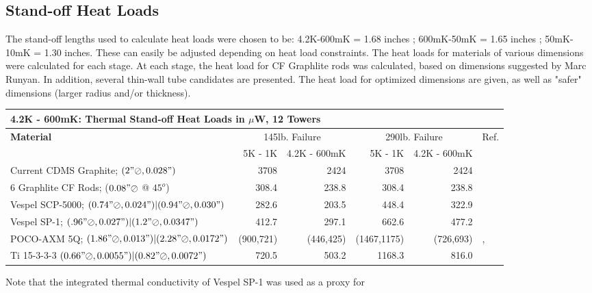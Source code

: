 \documentclass{report}
\begin{document}
\subsection{Stand-off Heat Loads}

The stand-off lengths used to calculate heat loads were chosen to be: 4.2K-600mK = 1.68 inches ; 600mK-50mK = 1.65 inches ; 50mK-10mK = 1.30 inches. These can easily be adjusted depending on heat load constraints. The heat loads for materials of various dimensions were calculated for each stage. At each stage, the heat load for CF Graphlite rods was calculated, based on dimensions suggested by Marc Runyan. In addition, several thin-wall tube candidates are presented. The heat load for optimized dimensions are given, as well as "safer" dimensions (larger  radius and/or thickness).

\begin{table}[h]
\begin{small}
\begin{threeparttable}
\begin{tabular}{lrrrrl}
  \multicolumn{5}{l}{{\Large 4.2K - 600mK: Thermal Stand-off Heat Loads in $\mu$W, 12 Towers}} \\
\toprule
\bf{{\large Material}}& \multicolumn{2}{c}{145lb. Failure} & \multicolumn{2}{c}{290lb. Failure} & Ref.\\
\cmidrule(r){2-5}
& 5K - 1K & 4.2K - 600mK & 5K - 1K & 4.2K - 600mK & \\
Current CDMS Graphite; $(2"\oslash,0.028")$  & 3708 & 2424 & 3708 & 2424 & \cite{lem}\\
6 Graphlite CF Rods; ($0.08" \oslash$ @ $45^{o}$) & 308.4 & 238.8 & 308.4 & 238.8 & \cite{run}\\
Vespel SCP-5000; $(0.74"\oslash,0.024")|(0.94"\oslash,0.030")$ & 282.6\tnote{\dag} & 203.5\tnote{\dag} & 448.4\tnote{\dag} & 322.9\tnote{\dag} & \cite{run}\\
Vespel SP-1; $(.96"\oslash,0.027")|(1.2"\oslash,0.0347")$ & 412.7 & 297.1 & 662.6 & 477.2 & \cite{run}\\
POCO-AXM 5Q; $(1.86"\oslash,0.013")|(2.28"\oslash,0.0172")$ & (900,721) & (446,425) & (1467,1175) & (726,693) & \cite{woo:gr},\cite{run}\\
Ti 15-3-3-3 $(0.66"\oslash,0.0055")|(0.82"\oslash,0.0072")$ & 720.5 & 503.2 & 1168.3 & 816.0 & \cite{wik}\\
\bottomrule
\end{tabular}
\begin{tablenotes}
\item[\dag] Note that the integrated thermal conductivity of Vespel SP-1 was used as a proxy for

\end{tablenotes}
\end{threeparttable}
\end{small}
\end{table}
\end{document}
